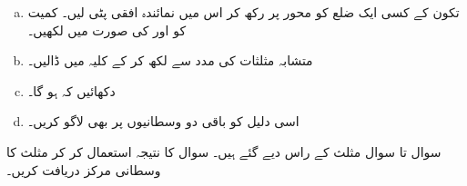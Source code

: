 \begin{enumerate}[a.]
\item
تکون کے کسی ایک ضلع کو محور  پر رکھ کر اس میں نمائندہ افقی پٹی  لیں۔ کمیت  کو  اور  کی صورت میں لکھیں۔ 
\item
متشابہ مثلثات کی مدد سے  لکھ کر  کے کلیہ میں ڈالیں۔
\item
دکھائیں کہ  ہو گا۔
\item
اسی دلیل کو باقی دو وسطانیوں پر بھی لاگو کریں۔
\end{enumerate}
سوال  تا سوال  مثلث کے راس دیے گئے ہیں۔ سوال  کا نتیجہ استعمال کر کر مثلث کا وسطانی مرکز دریافت کریں۔

